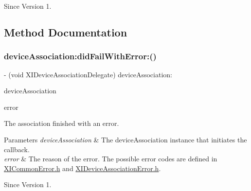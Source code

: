 \begin{DoxySince}{Since}
Version 1. 
\end{DoxySince}


\subsection{Method Documentation}
\hypertarget{protocol_x_i_device_association_delegate_01-p_af6d8945d9ace459debaec57a199b1f14}{}\label{protocol_x_i_device_association_delegate_01-p_af6d8945d9ace459debaec57a199b1f14} 
\subsubsection{\texorpdfstring{device\+Association\+:did\+Fail\+With\+Error\+:()}{deviceAssociation:didFailWithError:()}}
{\footnotesize\ttfamily -\/ (void X\+I\+Device\+Association\+Delegate) device\+Association\+: \begin{DoxyParamCaption}\item[{(id$<$ X\+I\+Device\+Association $>$)}]{device\+Association }\item[{didFailWithError:(N\+S\+Error $\ast$)}]{error }\end{DoxyParamCaption}}



The association finished with an error. 


\begin{DoxyParams}{Parameters}
{\em device\+Association} & The device\+Association instance that initiates the callback. \\
\hline
{\em error} & The reason of the error. The possible error codes are defined in \hyperlink{_x_i_common_error_8h}{X\+I\+Common\+Error.\+h} and \hyperlink{_x_i_device_association_error_8h}{X\+I\+Device\+Association\+Error.\+h}. \\
\hline
\end{DoxyParams}
\begin{DoxySince}{Since}
Version 1. 
\end{DoxySince}
\hypertarget{protocol_x_i_device_association_delegate_01-p_a8c02d311ae8e3fdc4995e5ca646a527a}{}\label{protocol_x_i_device_association_delegate_01-p_a8c02d311ae8e3fdc4995e5ca646a527a} 

